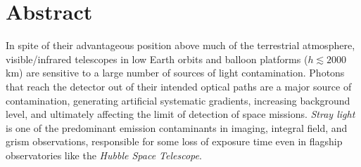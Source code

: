 \documentclass[usenames,dvipsnames,modern]{CLASS_FILES/aastex631}  %
\begin{document}

\section{Abstract}
\label{Sec:abstract}

In spite of their advantageous position above much of the terrestrial atmosphere, visible/infrared telescopes in low Earth orbits and balloon platforms ($h\lesssim2000$ km) are sensitive to a large number of sources of light contamination. Photons that reach the detector out of their intended optical paths are a major source of contamination, generating artificial systematic gradients, increasing background level, and ultimately affecting the limit of detection of space missions. \emph{Stray light} is one of the predominant emission contaminants in imaging, integral field, and grism observations, responsible for some loss of exposure time even in flagship observatories like the \emph{Hubble Space Telescope}.\\
\end{document}
